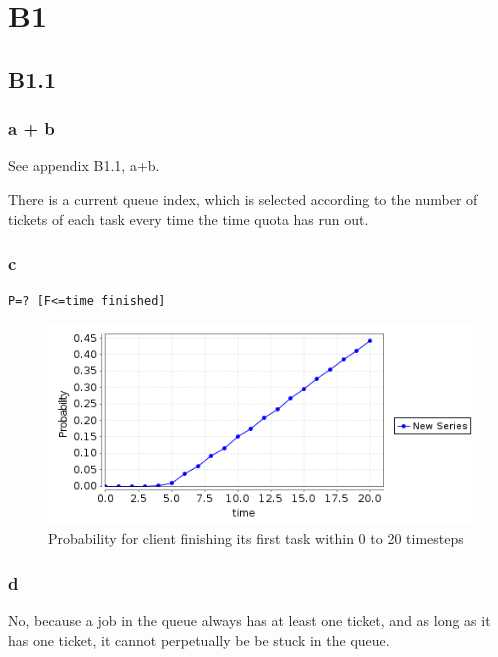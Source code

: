 
\section{B1}

\subsection{B1.1}

\subsubsection{a + b}

See appendix B1.1, a+b.

There is a current queue index,
which is selected according to the number
of tickets of each task every time the time quota
has run out.

\subsubsection{c}

\begin{verbatim}
P=? [F<=time finished]
\end{verbatim}

\begin{figure}[!htb]
\centering
\includegraphics[scale=.75]{images/B1_1_c.png}
\caption{Probability for client finishing its first task within 0 to 20 timesteps}
\label{fig:nojobprop}
\end{figure}

\subsubsection{d}

No, because a job in the queue always has at least one ticket,
and as long as it has one ticket, it cannot perpetually be
be stuck in the queue.

